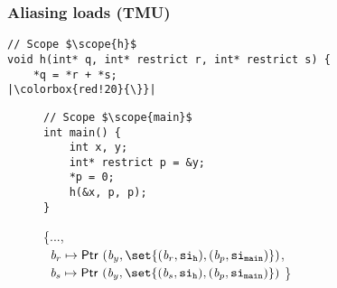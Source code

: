\begin{frame}[fragile]
\frametitle{Aliasing loads (TMU)}
\begin{verbatim}
// Scope $\scope{h}$
void h(int* q, int* restrict r, int* restrict s) {
    *q = *r + *s; 
|\colorbox{red!20}{\}}|
\end{verbatim}

\vspace*{-1cm}

\begin{figure}[!h]
\begin{minipage}[t]{.36\textwidth}

\begin{verbatim}
// Scope $\scope{main}$
int main() {
    int x, y;
    int* restrict p = &y;
    *p = 0;
    h(&x, p, p);
}
\end{verbatim}
\end{minipage}%
\begin{minipage}{.64\textwidth}

\executionannotation
{
\{..., \\\  $\Blockvar_r \mapsto \ptr{(\Blockvar_y, \set{(\Blockvar_r, \scope{h}), (\Blockvar_p, \scope{main})})} $, \\
            \ $\Blockvar_s \mapsto \ptr{(\Blockvar_y, \set{(\Blockvar_s, \scope{h}), (\Blockvar_p, \scope{main})})}$ \}
}
{
}
\end{minipage}
\end{figure}

\end{frame}

    


